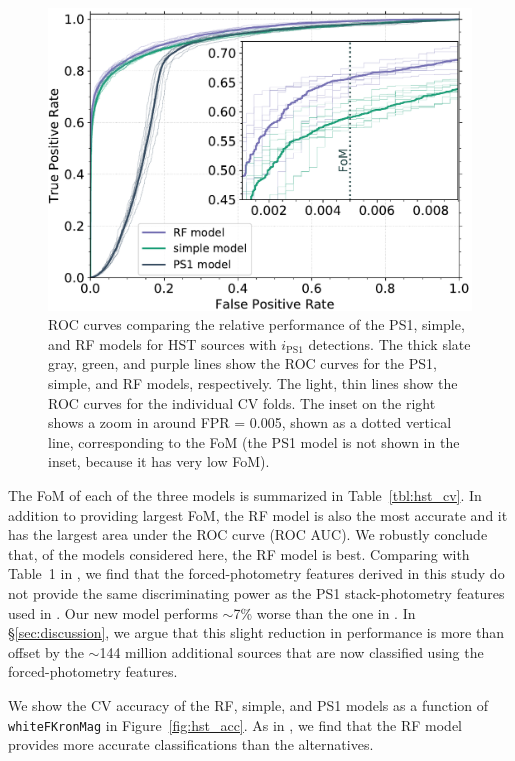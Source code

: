 \documentclass[twocolumn]{aastex63}
\begin{document}
\begin{figure}[t]
 \centering
  \includegraphics[width=\columnwidth]{./figures/CV_ROC_FHST.pdf}
  \caption{ ROC curves comparing the relative performance of the PS1, simple,
  and RF models for HST sources with $i_\mathrm{PS1}$ detections. The thick
  slate gray, green, and purple lines show the ROC curves for the PS1, simple,
  and RF models, respectively. The light, thin lines show the ROC curves for
  the individual CV folds. The inset on the right shows a zoom in around FPR =
  0.005, shown as a dotted vertical line, corresponding to the FoM (the PS1
  model is not shown in the inset, because it has very low FoM).}
  \label{fig:hst_roc}
\end{figure}

The FoM of each of the three models is summarized in Table~\ref{tbl:hst_cv}.
In addition to providing largest FoM, the RF model is also the most accurate
and it has the largest area under the ROC curve (ROC AUC). We robustly
conclude that, of the models considered here, the RF model is best. Comparing
with Table~1 in \citet{Tachibana18}, we find that the forced-photometry
features derived in this study do not provide the same discriminating power as
the PS1 stack-photometry features used in \citet{Tachibana18}. Our new model
performs $\sim$7\% worse than the one in \citet{Tachibana18}. In
\S\ref{sec:discussion}, we argue that this slight reduction in performance is
more than offset by the $\sim$144 million additional sources that are now
classified using the forced-photometry features.



We show the CV accuracy of the RF, simple, and PS1 models as a function of
\texttt{whiteFKronMag} in Figure~\ref{fig:hst_acc}. As in \citet{Tachibana18},
we find that the RF model provides more accurate classifications than the
alternatives.
\end{document}
